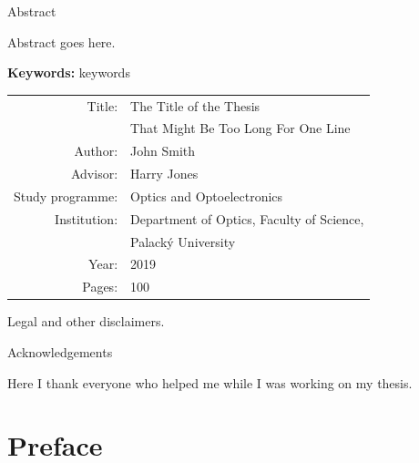 \documentclass[a4paper,12pt,twoside]{report}
\def\headingStyle{\sffamily}
\begin{document}
\pagestyle{empty}



\centerline{\headingStyle\Large Abstract}

\bigskip
\noindent

Abstract goes here.

\lipsum[1]

\vfil

\noindent\textbf{Keywords:} keywords

\vfil

{\centering
\begin{tabular}{rl}
Title: & The Title of the Thesis	\\
 & That Might Be Too Long For One Line	\\
Author: & John Smith	\\
Advisor: & Harry Jones	\\
Study programme: & Optics and Optoelectronics	\\
Institution: & Department of Optics, Faculty of Science,\\
 & Palacký University	\\
Year: & 2019	\\
Pages: & 100
\end{tabular}
}

\vfil
\noindent
Legal and other disclaimers.

\lipsum[2]

\clearpage


\mbox{}
\vfil

\centerline{\headingStyle\Large Acknowledgements}

\bigskip

\noindent
Here I thank everyone who helped me while I was working on my thesis.

\lipsum[3-4]

\vfil

\clearpage

\pagestyle{fancy}

\tableofcontents
{}

\chapter*{Preface}

\end{document}
